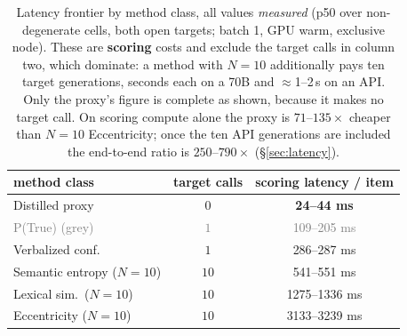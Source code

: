 \documentclass[11pt]{article}
\newcommand{\grey}[1]{\textcolor{gray}{#1}}
\begin{document}
\begin{table}[t]\centering\small
\setlength{\tabcolsep}{4pt}
\begin{tabular}{l c c}
\toprule
method class & target calls & scoring latency / item\\
\midrule
Distilled proxy   & $0$  & \textbf{24--44 ms}\\
\grey{P(True) (grey)} & \grey{$1$} & \grey{109--205 ms}\\
Verbalized conf.  & $1$  & 286--287 ms\\
Semantic entropy ($N{=}10$) & $10$ & 541--551 ms\\
Lexical sim.\ ($N{=}10$)    & $10$ & 1275--1336 ms\\
Eccentricity ($N{=}10$)     & $10$ & 3133--3239 ms\\
\bottomrule
\end{tabular}
\caption{Latency frontier by method class, all values \emph{measured} (p50 over
non-degenerate cells, both open targets; batch 1, GPU warm, exclusive node). These are
\textbf{scoring} costs and exclude the target calls in column two, which dominate: a method with
$N{=}10$ additionally pays ten target generations, seconds each on a 70B and $\approx$1--2\,s on
an API. Only the proxy's figure is complete as shown, because it makes no target call. On
scoring compute alone the proxy is $71$--$135\times$ cheaper than $N{=}10$ Eccentricity; once the
ten API generations are included the end-to-end ratio is $250$--$790\times$
(\S\ref{sec:latency}).}
\label{tab:latency}
\end{table}
\end{document}
